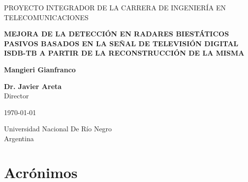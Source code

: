 \documentclass[12pt, letterpaper, oneside]{report}
\begin{document}
	
	\begin{titlepage}
		\begin{center}
			\vspace*{1cm}
			\LARGE
			PROYECTO INTEGRADOR DE LA CARRERA DE INGENIERÍA EN TELECOMUNICACIONES

			\vspace{1.5cm}

			\textbf{\MakeUppercase{Mejora de la detección  en radares biestáticos pasivos basados en la señal de televisión digital ISDB-Tb a partir de la reconstrucción de la misma }}

			\vspace{1.5cm}

			\textbf{Mangieri Gianfranco}


			\vspace{1.5cm}

			\textbf{Dr. Javier Areta}\\Director


			\vspace{1.5cm}


			\today


			\vspace{1.5cm}
			\Large
			Universidad Nacional De Río Negro\\
			Argentina

		\end{center}
	\end{titlepage}



\chapter*{Acrónimos}
\end{document}
